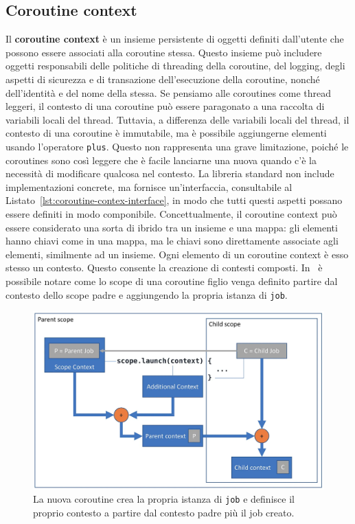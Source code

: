 \documentclass[12pt,a4paper,openright,twoside]{book}
\begin{document}
\subsection{Coroutine context}
Il \textbf{coroutine context} è un insieme persistente di oggetti definiti dall'utente che possono essere associati alla coroutine stessa. Questo insieme può includere oggetti responsabili delle politiche di threading della coroutine, del logging, degli aspetti di sicurezza e di transazione dell'esecuzione della coroutine, nonché dell'identità e del nome della stessa.
Se pensiamo alle coroutines come thread leggeri, il contesto di una coroutine può essere paragonato a una raccolta di variabili locali del thread. Tuttavia, a differenza delle variabili locali del thread, il contesto di una coroutine è immutabile, ma è possibile aggiungerne elementi usando l'operatore \texttt{plus}. Questo non rappresenta una grave limitazione, poiché le coroutines sono così leggere che è facile lanciarne una nuova quando c'è la necessità di modificare qualcosa nel contesto.
La libreria standard non include implementazioni concrete, ma fornisce un'interfaccia, consultabile al Listato~\ref{lst:coroutine-contex-interface}, in modo che tutti questi aspetti possano essere definiti in modo componibile. 
Concettualmente, il coroutine context può essere considerato una sorta di ibrido tra un insieme e una mappa: gli elementi hanno chiavi come in una mappa, ma le chiavi sono direttamente associate agli elementi, similmente ad un insieme.
Ogni elemento di un coroutine context è esso stesso un contesto. Questo consente la creazione di contesti composti.
In~ è possibile notare come lo scope di una coroutine figlio venga definito partire dal contesto dello scope padre e aggiungendo la propria istanza di \texttt{job}. 

\begin{figure}
    \centering
    \includegraphics[width=.80\linewidth]{figures/reactive-programming/coroutine-context.png}
    \caption{La nuova coroutine crea la propria istanza di \texttt{job} e definisce il proprio contesto a partire dal contesto padre più il job creato.}
    \label{fig:rp-coroutine-context}
\end{figure}
\end{document}
